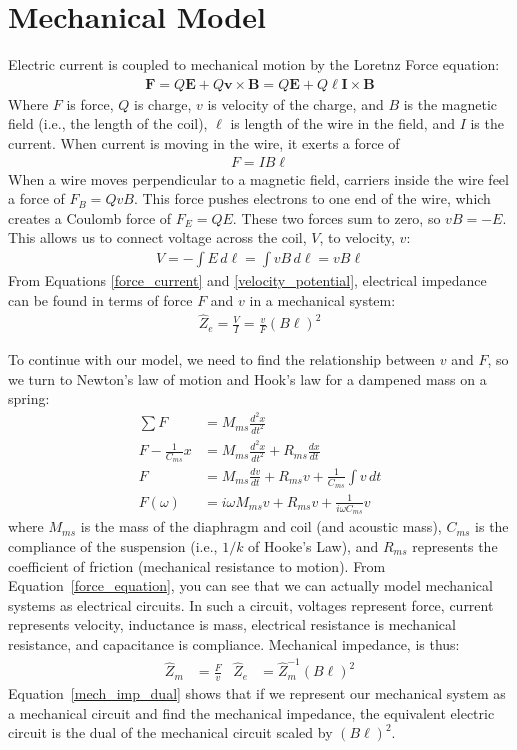 \documentclass[10pt]{book}
\begin{document}
\section{Mechanical Model}\label{mechanical_section}
Electric current is coupled to mechanical motion by the Loretnz Force equation:
\begin{align}
\mathbf{F}=Q\mathbf{E}+Q\mathbf{v}\times \mathbf{B}=Q\mathbf{E}+Q\ell\mathbf{I}\times \mathbf{B}
\end{align}
Where $F$ is force, $Q$ is charge, $v$ is velocity of the charge, and $B$ is the magnetic field (i.e., the length of the coil), $\ell$ is length of the wire in the field, and $I$ is the current. When current is moving in the wire, it exerts a force of
\begin{align}
F=IB\ell\label{force_current}
\end{align}
When a wire moves perpendicular to a magnetic field, carriers inside the wire feel a force of $F_B=QvB$. This force pushes electrons to one end of the wire, which creates a Coulomb force of $F_E=QE$. These two forces sum to zero, so $vB=-E$. This allows us to connect voltage across the coil, $V$, to velocity, $v$:
\begin{align}
V=-\int E\,d\ell=\int vB\,d\ell=vB\ell\label{velocity_potential}
\end{align}
From Equations \ref{force_current} and \ref{velocity_potential}, electrical impedance can be found in terms of force $F$ and $v$ in a mechanical system:
\begin{align}
\hat{Z}_e=\frac{V}{I}=\frac{v}{F}\left(B\ell\right)^2
\end{align}

To continue with our model, we need to find the relationship between $v$ and $F$, so we turn to Newton's law of motion and Hook's law for a dampened mass on a spring:
\begin{align}
\sum F&=M_{ms}\frac{d^2x}{dt^2}\\
F-\frac{1}{C_{ms}}x&=M_{ms}\frac{d^2x}{dt^2}+R_{ms}\frac{dx}{dt}\\
F&=M_{ms}\frac{dv}{dt}+R_{ms}v+\frac{1}{C_{ms}}\int v\,dt\\
F(\omega)&=i\omega M_{ms}v+R_{ms}v+\frac{1}{i\omega C_{ms}}v\label{force_equation}
\end{align}
where $M_{ms}$ is the mass of the diaphragm and coil (and acoustic mass), $C_{ms}$ is the compliance of the suspension (i.e., $1/k$ of Hooke's Law), and $R_{ms}$ represents the coefficient of friction (mechanical resistance to motion). From Equation~\ref{force_equation}, you can see that we can actually model mechanical systems as electrical circuits. In such a circuit,  voltages represent force, current represents velocity, inductance is mass, electrical resistance is mechanical resistance, and capacitance is compliance. Mechanical impedance, is thus:
\begin{align}
\hat{Z}_m&=\frac{F}{v}& \hat{Z}_e &= \hat{Z}_m^{-1} (B\ell)^2\label{mech_imp_dual}
\end{align}
Equation~\ref{mech_imp_dual} shows that if we represent our mechanical system as a mechanical circuit and find the mechanical impedance, the equivalent electric circuit is the dual of the mechanical circuit scaled by $(B\ell)^2$.
\end{document}
